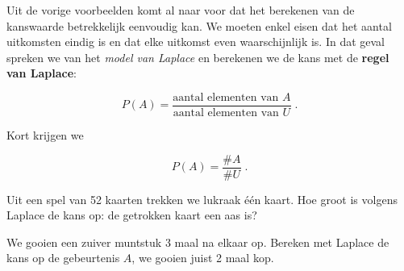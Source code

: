 \documentclass[12pt,a4paper,twoside]{article}
\begin{document}
Uit de vorige voorbeelden komt al naar voor dat het berekenen van de kanswaarde betrekkelijk eenvoudig kan. We moeten enkel eisen dat het aantal uitkomsten eindig is en dat elke uitkomst even waarschijnlijk is. In dat geval spreken we van het {\em model van Laplace} en berekenen we de kans met de {\bf regel van Laplace}:

$$P(A)=\dfrac{\mbox{aantal elementen van }A}{\mbox{aantal elementen van }U}\;.$$

Kort krijgen we\\
\begin{mdframed}
$$P(A)=\dfrac{\#A}{\#U}\;.$$
\end{mdframed}

\begin{oefening}
Uit een spel van 52 kaarten trekken we lukraak één kaart. Hoe groot is volgens Laplace de kans op: de getrokken kaart een aas is?
\end{oefening}

\begin{oefening}
We gooien een zuiver muntstuk 3 maal na elkaar op. Bereken met Laplace de kans op de gebeurtenis $A$, we gooien juist 2 maal kop.
\end{oefening}
\end{document}
